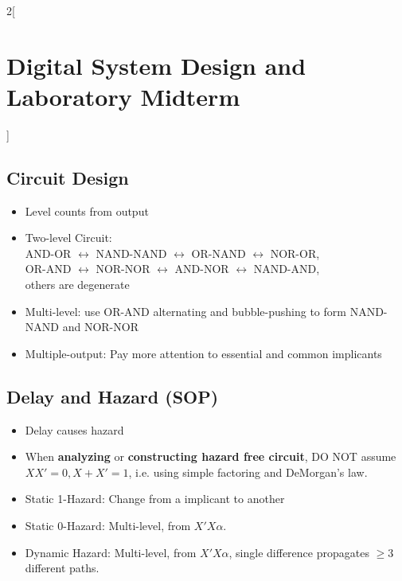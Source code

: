 \documentclass[10pt,a4paper,twoside]{article}
\begin{document}
\begin{multicols}{2}[\section*{Digital System Design and Laboratory Midterm}]
		\subsection*{Circuit Design}
		\begin{itemize}
			\item Level counts from output
			\item Two-level Circuit: \\
			AND-OR $\leftrightarrow$ NAND-NAND $\leftrightarrow$ OR-NAND $\leftrightarrow$ NOR-OR, \\
			OR-AND $\leftrightarrow$ NOR-NOR $\leftrightarrow$ AND-NOR $\leftrightarrow$ NAND-AND, \\
			others are degenerate
			\item Multi-level: use OR-AND alternating and bubble-pushing to form NAND-NAND and NOR-NOR 
			\item Multiple-output: Pay more attention to essential and common implicants
		\end{itemize}
		\subsection*{Delay and Hazard (SOP)}
		\begin{itemize}
			\item Delay causes hazard
			\item When \textbf{analyzing} or \textbf{constructing hazard free circuit}, DO NOT assume $XX' = 0, X + X' = 1$, i.e. using simple factoring and DeMorgan's law.
			\item Static 1-Hazard: Change from a implicant to another
			\item Static 0-Hazard: Multi-level, from $X'X\alpha$.
			\item Dynamic Hazard: Multi-level, from $X'X\alpha$, single difference propagates $\geq 3$ different paths.
		\end{itemize}
	\end{multicols}
\end{document}
